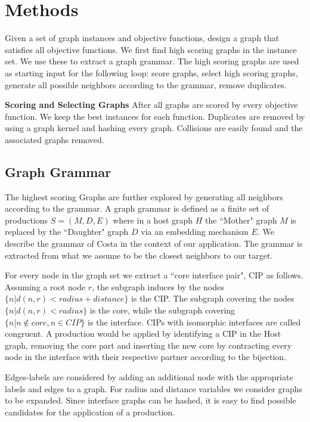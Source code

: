 \documentclass{esannV2} \usepackage[dvips]{graphicx}
\begin{document}

\section{Methods}
Given a set of graph instances and objective functions, design a graph that
satisfies all objective functions.  We first find high scoring graphs in the
instance set. We use these to extract a graph grammar.  The high scoring graphs
are used as starting input for the following loop: score graphs, select high
scoring graphs, generate all possible neighbors according to the grammar,
remove duplicates.

\textbf{Scoring and Selecting Graphs} After all graphs are scored by every
objective function. We keep the best instances for each function.  Duplicates
are removed by using a graph kernel and hashing every graph.  Collisions are
easily found and the associated graphs removed.

\subsection{Graph Grammar} The highest scoring Graphs are further explored by
generating all neighbors according to the grammar. A graph grammar is defined
as a finite set of productions $S=(M,D,E)$ where in a host graph $H$ the
``Mother" graph $M$ is replaced by the ``Daughter" graph $D$ via an embedding
mechanism $E$. We describe the grammar of Costa \cite{costa16gl} in the context
of our application.  The grammar is extracted from what we assume to be the
closest neighbors to our target.

For every node in the graph set we extract a ``core interface pair", CIP as
follows.  Assuming a root node $r$, the subgraph induces by the nodes $\{ n |
d(n,r) < radius+distance \}$ is the CIP.  The subgraph covering the nodes $\{ n
| d(n,r) < radius \}$ is the core, while the subgraph covering $\{ n | n \notin
core , n \in CIP \}$ is the interface.  CIPs with isomorphic interfaces are
called congruent.  A production would be applied by identifying a CIP in the
Host graph, removing the core part and inserting the new core by contracting
every node in the interface with their respective partner according to the
bijection.

Edges-labels are considered by adding an additional node with the appropriate
labels and edges to a graph. For radius and distance variables we consider
graphs to be expanded.  Since interface graphs can be hashed, it is easy to
find possible candidates for the application of a production. 
\end{document}
